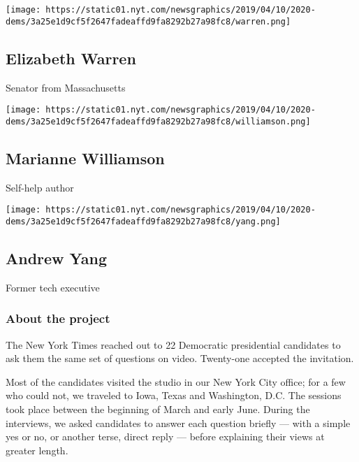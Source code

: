 \texttt{[image: https://static01.nyt.com/newsgraphics/2019/04/10/2020-dems/3a25e1d9cf5f2647fadeaffd9fa8292b27a98fc8/warren.png]}

\hypertarget{elizabeth-warren}{%
\subsection{Elizabeth Warren}\label{elizabeth-warren}}

Senator from Massachusetts

\href{https://www.nytimes.com/interactive/2019/us/politics/marianne-williamson-2020-campaign.html}{}

\texttt{[image: https://static01.nyt.com/newsgraphics/2019/04/10/2020-dems/3a25e1d9cf5f2647fadeaffd9fa8292b27a98fc8/williamson.png]}

\hypertarget{marianne-williamson}{%
\subsection{Marianne Williamson}\label{marianne-williamson}}

Self-help author

\href{https://www.nytimes.com/interactive/2019/us/politics/andrew-yang-2020-campaign.html}{}

\texttt{[image: https://static01.nyt.com/newsgraphics/2019/04/10/2020-dems/3a25e1d9cf5f2647fadeaffd9fa8292b27a98fc8/yang.png]}

\hypertarget{andrew-yang}{%
\subsection{Andrew Yang}\label{andrew-yang}}

Former tech executive

\hypertarget{about-the-project}{%
\subsubsection{\texorpdfstring{\textbf{About the
project}}{About the project}}\label{about-the-project}}

The New York Times reached out to 22 Democratic presidential candidates
to ask them the same set of questions on video. Twenty-one accepted the
invitation.

Most of the candidates visited the studio in our New York City office;
for a few who could not, we traveled to Iowa, Texas and Washington, D.C.
The sessions took place between the beginning of March and early June.
During the interviews, we asked candidates to answer each question
briefly --- with a simple yes or no, or another terse, direct reply ---
before explaining their views at greater length.

